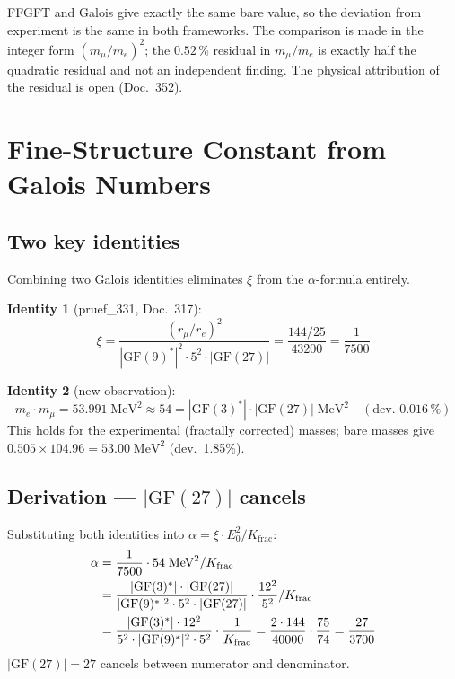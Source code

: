 FFGFT and Galois give exactly the same bare value, so the deviation from
experiment is the same in both frameworks. The comparison is made in the
integer form $(m_\mu/m_e)^2$; the $0.52\,\%$ residual in $m_\mu/m_e$ is exactly
half the quadratic residual and not an independent finding. The physical
attribution of the residual is open (Doc.~352).

\section{Fine-Structure Constant from Galois Numbers}

\subsection{Two key identities}

Combining two Galois identities eliminates $\xi$ from the
$\alpha$-formula entirely.

\textbf{Identity 1} (pruef\_331, Doc.~317):
\begin{equation}
  \xi = \frac{(r_\mu/r_e)^2}{|\text{GF}(9)^*|^2 \cdot 5^2 \cdot |\text{GF}(27)|}
  = \frac{144/25}{43200} = \frac{1}{7500}
\end{equation}

\textbf{Identity 2} (new observation):
\begin{equation}
  m_e \cdot m_\mu = 53.991\;\text{MeV}^2
  \approx 54 = |\text{GF}(3)^*| \cdot |\text{GF}(27)| \;\text{MeV}^2
  \quad (\text{dev. } 0.016\,\%)
\end{equation}
This holds for the experimental (fractally corrected) masses;
bare masses give $0.505 \times 104.96 = 53.00\;\text{MeV}^2$ (dev.\ 1.85\%).

\subsection{Derivation — \texorpdfstring{$|\text{GF}(27)|$}{GF(27)} cancels}

Substituting both identities into $\alpha = \xi \cdot E_0^2 / K_\text{frac}$:
\begin{align}
  \alpha &= \frac{1}{7500} \cdot 54\;\text{MeV}^2 / K_\text{frac} \notag\\
         &= \frac{|\text{GF}(3)^*| \cdot |\text{GF}(27)|}
              {|\text{GF}(9)^*|^2 \cdot 5^2 \cdot |\text{GF}(27)|} \cdot
              \frac{12^2}{5^2} / K_\text{frac} \notag\\
         &= \frac{|\text{GF}(3)^*| \cdot 12^2}
              {5^2 \cdot |\text{GF}(9)^*|^2 \cdot 5^2} \cdot \frac{1}{K_\text{frac}}
         = \frac{2 \cdot 144}{40000} \cdot \frac{75}{74}
         = \frac{27}{3700}
\end{align}
$|\text{GF}(27)| = 27$ cancels between numerator and denominator.

